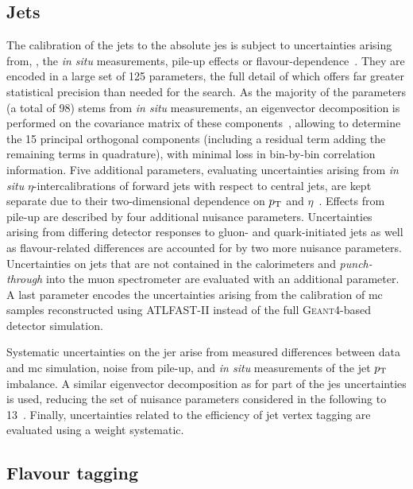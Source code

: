 \subsection{Jets}

The calibration of the jets to the absolute \gls{jes} is subject to uncertainties arising from, \eg, the \textit{in situ} measurements, pile-up effects or flavour-dependence~\cite{Aad:2020flx}. They are encoded in a large set of 125 parameters, the full detail of which offers far greater statistical precision than needed for the \onelepton search.
As the majority of the parameters (a total of 98) stems from \textit{in situ} measurements, an eigenvector decomposition is performed on the covariance matrix of these components~\cite{ATL-PHYS-PUB-2015-014}, allowing to determine the 15 principal orthogonal components (including a residual term adding the remaining terms in quadrature), with minimal loss in bin-by-bin correlation information.
Five additional parameters, evaluating uncertainties arising from \textit{in situ} $\eta$-intercalibrations of forward jets with respect to central jets, are kept separate due to their two-dimensional dependence on $p_{\mathrm{T}}$ and $\eta$~\cite{Aad:2020flx}.
Effects from pile-up are described by four additional nuisance parameters. Uncertainties arising from differing detector responses to gluon- and quark-initiated jets as well as flavour-related differences are accounted for by two more nuisance parameters.
Uncertainties on jets that are not contained in the calorimeters and \textit{punch-through} into the muon spectrometer are evaluated with an additional parameter.
A last parameter encodes the uncertainties arising from the calibration of \gls{mc} samples reconstructed using \textsc{ATLFAST-II} instead of the full \textsc{Geant4}-based detector simulation.

Systematic uncertainties on the \gls{jer} arise from measured differences between data and \gls{mc} simulation, noise from pile-up, and \textit{in situ} measurements of the jet $p_{\mathrm{T}}$ imbalance.
A similar eigenvector decomposition as for part of the \gls{jes} uncertainties is used, reducing the set of nuisance parameters considered in the following to 13~\cite{Aad:2020flx}.
Finally, uncertainties related to the efficiency of jet vertex tagging are evaluated using a weight systematic.

\subsection{Flavour tagging}
 
